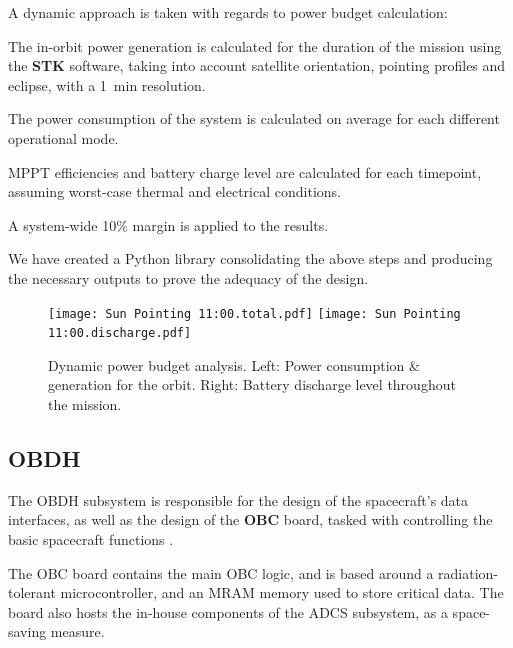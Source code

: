 \documentclass[a4paper,nobib,final]{tufte-book}
\begin{document}
\FloatBarrier
A dynamic approach is taken with regards to power budget calculation:
\begin{compactenum}
	\item The in-orbit power generation is calculated for the duration of the mission using the \textbf{STK} software, taking into account satellite orientation, pointing profiles and eclipse, with a \SI{1}{\minute} resolution.
	\item The power consumption of the system is calculated on average for each different operational mode.
	\item \acs{MPPT} efficiencies and battery charge level are calculated for each timepoint, assuming worst-case thermal and electrical conditions.
	\item A system-wide 10\% margin is applied to the results.
\end{compactenum}

We have created a Python library consolidating the above steps and producing the necessary outputs to prove the adequacy of the design.

\begin{figure}[h]
	\texttt{[image: Sun Pointing 11:00.total.pdf]}
	\hfill
	\texttt{[image: Sun Pointing 11:00.discharge.pdf]}

	\caption[Dynamic power budget analysis]{Dynamic power budget analysis. Left: Power consumption \& generation for the orbit. Right: Battery discharge level throughout the mission.}
\end{figure}

\subsection{\acf{OBDH}}
\label{sec:obdh}

The \ac{OBDH} subsystem is responsible for the design of the spacecraft's data interfaces, as well as the design of the \textbf{\acf{OBC}} board, tasked with controlling the basic spacecraft functions \autocite{DDJF_OBDH}.

The \ac{OBC} board contains the main \ac{OBC} logic, and is based around a  radiation-tolerant microcontroller, and an \acs{MRAM} memory used to store critical data. The board also hosts the in-house components of the \ac{ADCS} subsystem, as a space-saving measure.
\end{document}
